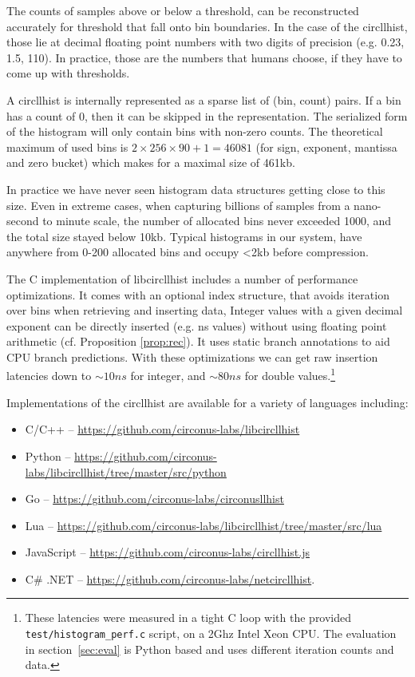 \documentclass{article}
\theoremstyle{plain}
\theoremstyle{remark}
\begin{document}
The counts of samples above or below a threshold, can be reconstructed accurately for threshold
that fall onto bin boundaries. In the case of the circllhist, those lie at decimal floating point
numbers with two digits of precision (e.g. 0.23, 1.5, 110). In practice, those are the numbers
that humans choose, if they have to come up with thresholds.

A circllhist is internally represented as a sparse list of (bin, count) pairs.  If a bin has a count
of 0, then it can be skipped in the representation.  The serialized form of the histogram will only
contain bins with non-zero counts.  The theoretical maximum of used bins is $2 \times 256 \times 90
+ 1 = 46081$ (for sign, exponent, mantissa and zero bucket) which makes for a maximal size of 461kb.

In practice we have never seen histogram data structures getting close to this size.  Even in
extreme cases, when capturing billions of samples from a nano-second to minute scale, the number of
allocated bins never exceeded 1000, and the total size stayed below 10kb.
Typical histograms in our system, have anywhere from 0-200 allocated bins and occupy <2kb before
compression.

The C implementation of libcircllhist includes a number of performance optimizations.  It comes with
an optional index structure, that avoids iteration over bins when retrieving and inserting data,
Integer values with a given decimal exponent can be directly inserted (e.g. ns values) without using
floating point arithmetic (cf. Proposition \ref{prop:rec}).  It uses static branch annotations to
aid CPU branch predictions.  With these optimizations we can get raw insertion latencies down to
$\sim 10ns$ for integer, and $\sim 80ns$ for double values.\footnote{ These latencies were measured
in a tight C loop with the provided \texttt{test/histogram\_perf.c} script, on a 2Ghz Intel Xeon
CPU.  The evaluation in section~\ref{sec:eval} is Python based and uses different iteration counts
and data. }

Implementations of the circllhist are available for a variety of languages including:
\begin{itemize}
\item C/C++ -- \url{https://github.com/circonus-labs/libcircllhist}
\item Python -- \url{https://github.com/circonus-labs/libcircllhist/tree/master/src/python}
\item Go -- \url{https://github.com/circonus-labs/circonusllhist}
\item Lua -- \url{https://github.com/circonus-labs/libcircllhist/tree/master/src/lua}
\item JavaScript -- \url{https://github.com/circonus-labs/circllhist.js}
\item C\# .NET -- \url{https://github.com/circonus-labs/netcircllhist}.
\end{itemize}
\end{document}
